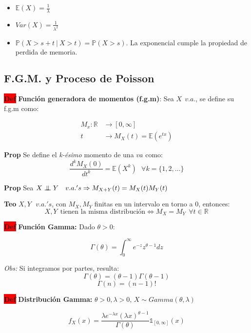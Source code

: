 \documentclass[letterpaper,10.5pt,twocolumn]{article} %
\newcommand{\R}[1][]{\mathbb{R}^{#1}}
\newcommand{\E}{\mathbb{E} }
\newcommand{\Proba}{\mathbb{P} }
\newcommand{\hlc}[2][yellow]{ \colorbox{#1}{#2} }
\newcommand{\Prop}{\hlc[amber]{\bfseries Prop}}
\newcommand{\Def}{\hlc[red]{\bfseries Def}}
\newcommand{\Teo}{\hlc[applegreen]{\bfseries Teo}}
\newcommand{\independent}{\perp\mkern-9.5mu\perp}
\let\oldfrac=\frac
\renewcommand{\frac}[2]{\ensuremath{\oldfrac{#1}{#2}}}
\begin{document}
\begin{itemize}
    \item $\E(X)=\frac{1}{\lambda} $
    \item $Var(X) = \frac{1}{\lambda^2} $
    \item $\Proba (X> s+t\ |\ X>t ) = \Proba (X>s) $. La exponencial cumple la propiedad de perdida de memoria.
\end{itemize}


\subsection{F.G.M. y Proceso de Poisson}

\Def \textbf{Función generadora de momentos (f.g.m)}: Sea $X\ \ v.a.$, se define su f.g.m como:

\begin{align*}
    M_x : \R &\rightarrow [0,\infty]\\
    t &\rightarrow M_X (t) = \E (e^{tx})
\end{align*}

\Prop Se define el \textit{k-ésimo} momento de una $va$ como: $$\dfrac{d^k M_X (0)}{dt^k}= \E (X^k)\ \ \ \forall k=\{1,2,\ldots\} $$ 

\Prop Sea $X \independent Y\ \ \ v.a.'s \Rightarrow M_{X+Y}(t) = M_X (t) M_Y (t) $

\Teo $X,Y\ \ \ v.a.'s $, con $M_{X}, M_Y $ finitas en un intervalo en torno a 0, entonces:
\begin{equation*}
    X, Y\ \  \textrm{tienen la misma distribución} \Leftrightarrow M_{X} = M_Y\ \ \forall t \in \R
\end{equation*}

\Def \textbf{Función Gamma:} Dado $\theta > 0$:

\begin{equation*}
    \Gamma (\theta) = \int_{0}^{\infty} e^{-z} z^{\theta-1} dz
\end{equation*}

\textit{Obs:} Si integramos por partes, resulta: $$ \Gamma(\theta) = (\theta-1) \Gamma(\theta-1) $$ $$ \Gamma(n) = (n-1)! $$

\Def \textbf{Distribución Gamma:} $\theta>0, \lambda>0 $, $X\sim Gamma(\theta, \lambda)$

\begin{equation*}
    f_X(x) = \dfrac{\lambda e^{-\lambda x} (\lambda x)^{\theta -1}}{\Gamma (\theta)} \mathds{1}_{[0,\infty]} (x)
\end{equation*}
\end{document}
